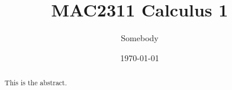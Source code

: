\documentclass{xourse}
\title{MAC2311 Calculus 1}
\author{Somebody}
\date{\today}
\begin{document}
\begin{abstract}
	This is the abstract.
\end{abstract}

\maketitle

\tableofcontents


\end{document}
